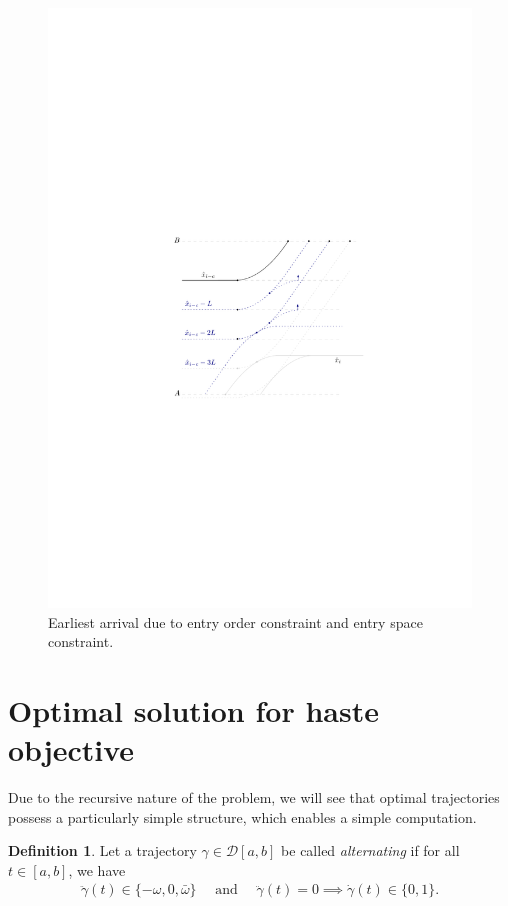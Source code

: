 \documentclass[a4paper]{article}
\theoremstyle{definition}
\newtheorem{define}{Definition\hspace{0.25em}\ignorespaces}
\theoremstyle{plain}
\begin{document}
\begin{figure}
  \centering
  \includegraphics[scale=1]{figures/motion/earliest-arrival}
 \caption{Earliest arrival due to entry order constraint and entry space constraint.}%
\end{figure}



\newpage

\section{Optimal solution for haste objective}

Due to the recursive nature of the problem, we will see that optimal
trajectories possess a particularly simple structure, which enables a simple
computation.

\begin{define}
  Let a trajectory $\gamma \in \mathcal{D}[a, b]$ be called \emph{alternating} if for all
  $t \in [a, b]$, we have
  \begin{align}
    \ddot{\gamma}(t) \in \{-\omega, 0, \bar{\omega}\} \quad \text{ and } \quad
    \ddot{\gamma}(t) = 0 \implies \dot{\gamma}(t) \in \{0, 1\}.
  \end{align}
\end{define}
\end{document}
